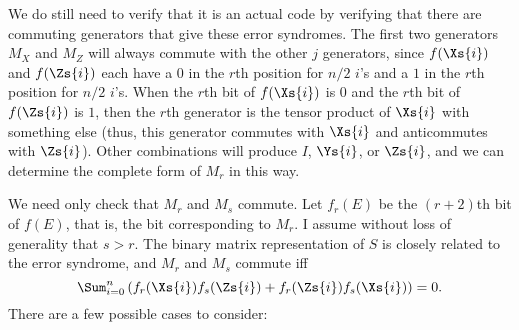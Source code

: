 We do still need to verify that it is an actual code by verifying that
there are commuting generators that give these error syndromes.  The
first two generators $M_X$ and $M_Z$ will always commute with the
other $j$ generators, since $f(\Xs{i})$ and $f(\Zs{i})$ each have a $0$ in the
$r$th position for $n/2$ $i$'s and a $1$ in the $r$th position for $n/2$ $i$'s.
When the $r$th bit of $f(\Xs{i})$ is $0$  and the $r$th bit of $f(\Zs{i})$ is
$1$, then the $r$th generator is the tensor product of $\Xs{i}$ with something
else (thus, this generator commutes with $\Xs{i}$ and anticommutes with
$\Zs{i}$).  Other combinations will produce $I$, $\Ys{i}$, or $\Zs{i}$, and
we can determine the complete form of $M_r$ in this way.

We need only check that $M_r$ and $M_s$ commute.  Let $f_r (E)$ be the
$(r+2)$th bit of $f(E)$, that is, the bit corresponding to $M_r$.  I assume
without loss of generality that $s > r$.  The binary matrix representation of
$S$ is closely related to the error syndrome, and $M_r$ and $M_s$
commute iff
\begin{equation}
	\Sum_{i=0}^{n} \left( f_r (\Xs{i}) f_s (\Zs{i}) + f_r (\Zs{i}) f_s (\Xs{i})
	\right) = 0.
\end{equation}
There are a few possible cases to consider:

